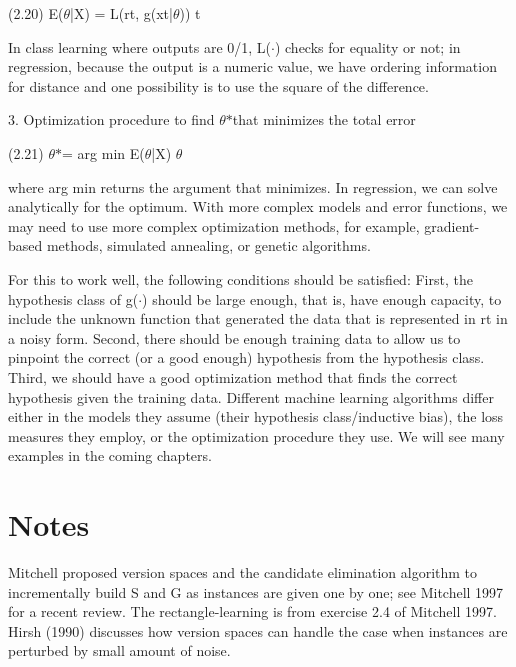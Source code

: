 (2.20) E($\theta$|X) = L(rt, g(xt|$\theta$)) t

In class learning where outputs are 0/1, L($\cdot$) checks for equality or not; in regression, because the output is a numeric value, we have ordering information for distance and one possibility is to use the square of the difference.

3. Optimization procedure to find $\theta$$*$that minimizes the total error

(2.21) $\theta$$*$= arg min E($\theta$|X) $\theta$

where arg min returns the argument that minimizes. In regression, we can solve analytically for the optimum. With more complex models and error functions, we may need to use more complex optimization methods, for example, gradient-based methods, simulated annealing, or genetic algorithms.

For this to work well, the following conditions should be satisfied: First, the hypothesis class of g($\cdot$) should be large enough, that is, have enough capacity, to include the unknown function that generated the data that is represented in rt in a noisy form. Second, there should be enough training data to allow us to pinpoint the correct (or a good enough) hypothesis from the hypothesis class. Third, we should have a good optimization method that finds the correct hypothesis given the training data. Different machine learning algorithms differ either in the models they assume (their hypothesis class/inductive bias), the loss measures they employ, or the optimization procedure they use. We will see many examples in the coming chapters.

\section{Notes}

Mitchell proposed version spaces and the candidate elimination algorithm to incrementally build S and G as instances are given one by one; see Mitchell 1997 for a recent review. The rectangle-learning is from exercise 2.4 of Mitchell 1997. Hirsh (1990) discusses how version spaces can handle the case when instances are perturbed by small amount of noise.

